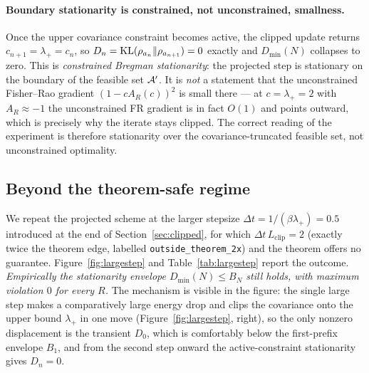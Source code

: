 \documentclass[11pt]{article}
\begin{document}
\paragraph{Boundary stationarity is constrained, not unconstrained, smallness.}
Once the upper covariance constraint becomes active, the clipped update returns
$c_{n+1}=\lambda_+=c_n$, so $D_n=\mathrm{KL}(\rho_{a_n}\|\rho_{a_{n+1}})=0$ exactly and
$D_{\min}(N)$ collapses to zero. This is \emph{constrained Bregman stationarity}:
the projected step is stationary on the boundary of the feasible set
$\mathcal{A}'$. It is \emph{not} a statement that the unconstrained Fisher--Rao
gradient $(1-cA_R(c))^2$ is small there --- at $c=\lambda_+=2$ with
$A_R\approx-1$ the unconstrained FR gradient is in fact $O(1)$ and points
outward, which is precisely why the iterate stays clipped. The correct reading
of the experiment is therefore stationarity over the covariance-truncated
feasible set, not unconstrained optimality.

\subsection{Beyond the theorem-safe regime}
\label{sec:largestep}

We repeat the projected scheme at the larger stepsize $\Delta t=1/(\beta\lambda_+)=0.5$
introduced at the end of Section~\ref{sec:clipped}, for which
$\Delta t\,L_{\mathrm{clip}}=2$ (exactly twice the theorem edge, labelled
\texttt{outside\_theorem\_2x}) and the theorem offers no guarantee.
Figure~\ref{fig:largestep} and Table~\ref{tab:largestep} report the outcome.
\emph{Empirically the stationarity envelope $D_{\min}(N)\le B_N$ still holds, with
maximum violation $0$ for every $R$.} The mechanism is visible in the figure: the
single large step makes a comparatively large energy drop and clips the
covariance onto the upper bound $\lambda_+$ in one move
(Figure~\ref{fig:largestep}, right), so the only nonzero displacement is the
transient $D_0$, which is comfortably below the first-prefix envelope $B_1$, and
from the second step onward the active-constraint stationarity gives $D_n=0$.
\end{document}
